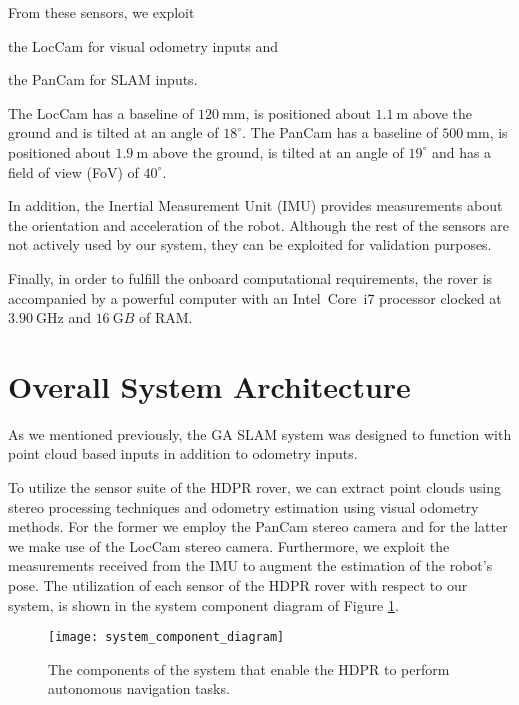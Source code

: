 From these sensors, we exploit
\begin{enumerate*}[label=(\roman*)]
    \item the LocCam for visual odometry inputs and
    \item the PanCam for SLAM inputs.
\end{enumerate*}
The LocCam has a baseline of $\SI{120}{\mm}$, is positioned about
$\SI{1.1}{\m}$ above the ground and is tilted at an angle of $18^{\circ}$.
The PanCam has a baseline of $\SI{500}{\mm}$, is positioned about
$\SI{1.9}{\m}$ above the ground, is tilted at an angle of $19^{\circ}$ and
has a field of view (FoV) of $40^{\circ}$.

In addition, the Inertial Measurement Unit (IMU) provides measurements about
the orientation and acceleration of the robot.
Although the rest of the sensors are not actively used by our system,
they can be exploited for validation purposes.

Finally, in order to fulfill the onboard computational requirements, the
rover is accompanied by a powerful computer with an Intel\textcopyright\
Core\texttrademark\ i7 processor clocked at $\SI{3.90}{\giga\hertz}$ and
$\SI{16}{\giga B}$ of RAM.

\section{Overall System Architecture}

As we mentioned previously, the GA SLAM system was designed to function
with point cloud based inputs in addition to odometry inputs.

To utilize the sensor suite of the HDPR rover, we can extract point clouds
using stereo processing techniques and odometry estimation using visual
odometry methods.
For the former we employ the PanCam stereo camera and for the latter we make
use of the LocCam stereo camera.
Furthermore, we exploit the measurements received from the IMU to augment
the estimation of the robot's pose.
The utilization of each sensor of the HDPR rover with respect to our system,
is shown in the system component diagram of Figure
\ref{fig:system_component_diagram}.

\begin{figure}[h!]
    \centering
    \texttt{[image: system\_component\_diagram]}
    \caption[System component diagram]{
        The components of the system that enable the HDPR to perform
        autonomous navigation tasks.
    }
    \label{fig:system_component_diagram}
\end{figure}


